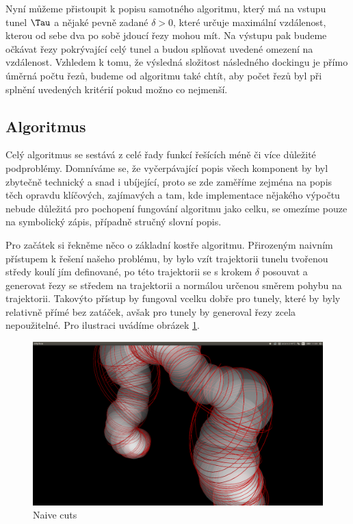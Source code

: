Nyní můžeme přistoupit k popisu samotného algoritmu, který má na vstupu tunel $ \Tau $
a nějaké pevně zadané $ \delta > 0$, které určuje maximální vzdálenost, kterou
od sebe dva po sobě jdoucí řezy mohou mít. Na výstupu pak budeme očkávat řezy pokrývající
celý tunel a budou splňovat uvedené omezení na vzdálenost. Vzhledem k tomu, že výsledná
složitost následného dockingu je přímo úměrná počtu řezů, budeme od algoritmu také chtít,
aby počet řezů byl při splnění uvedených kritérií pokud možno co nejmenší.


\subsection{Algoritmus}

Celý algoritmus se sestává z celé řady funkcí řešících méně či více důležité podproblémy.
Domníváme se, že vyčerpávající popis všech komponent by byl zbytečně technický a snad i
ubíjející, proto se zde zaměříme zejména na popis těch opravdu klíčových, zajímavých
a tam, kde implementace nějakého výpočtu nebude důležitá pro pochopení fungování
algoritmu jako celku, se omezíme pouze na symbolický zápis, případně stručný slovní
popis.

Pro začátek si řekněme něco o základní kostře algoritmu. Přirozeným naivním přístupem
k řešení našeho problému, by bylo vzít trajektorii tunelu tvořenou středy koulí
jím definované, po této trajektorii se s krokem $ \delta $ posouvat a generovat
řezy se středem na trajektorii a normálou určenou směrem pohybu na trajektorii.
Takovýto přístup by fungoval vcelku dobře pro tunely, které by byly relativně
přímé bez zatáček, avšak pro  tunely by generoval řezy zcela nepoužitelné.
Pro ilustraci uvádíme obrázek \ref{fig:naive_cuts}.

\begin{figure}[ht]
    \centering
    \includegraphics[width=\textwidth]{img/naive_cuts.png}
    \caption{Naive cuts}
  \centering
  \label{fig:naive_cuts}
\end{figure}

